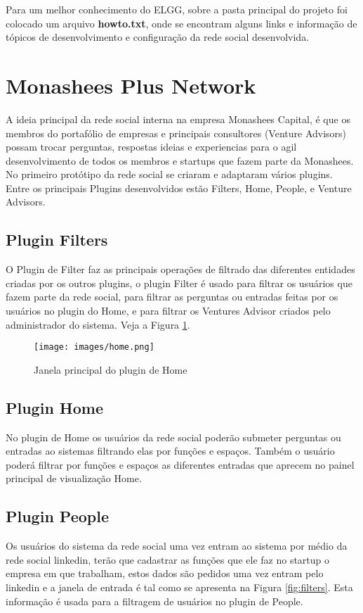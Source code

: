 \documentclass[12pt, letterpaper, onecolumn]{article}
\begin{document}
Para um melhor conhecimento do ELGG, sobre a pasta principal do projeto foi colocado um arquivo {\bf howto.txt}, onde se encontram alguns links e informação de tópicos de desenvolvimento e configuração da rede social desenvolvida.

\section{Monashees Plus Network}
A ideia principal da rede social interna na empresa Monashees Capital, é que os membros do portafólio de empresas e principais consultores (Venture Advisors) possam trocar perguntas, respostas ideias e experiencias para o agil desenvolvimento de todos os membros e startups que fazem parte da Monashees. \\

No primeiro protótipo da rede social se criaram e adaptaram vários plugins. Entre os principais Plugins desenvolvidos estão Filters, Home, People, e Venture Advisors.

\subsection{Plugin Filters}
O Plugin de Filter faz as principais operações de filtrado das diferentes entidades criadas por os outros plugins, o plugin Filter é usado para filtrar os usuários que fazem parte da rede social, para filtrar as perguntas ou entradas feitas por os usuários no plugin do Home, e para filtrar os Ventures Advisor criados pelo administrador do sistema. Veja a Figura \ref{fig:Home}.

\begin{figure}[htpb]
\centering
\texttt{[image: images/home.png]}
\caption{Janela principal do plugin de Home}
\label{fig:Home}
\end{figure}

\subsection{Plugin Home}
No plugin de Home os usuários da rede social poderão submeter perguntas ou entradas ao sistemas filtrando elas por funções e espaços. Também o usuário poderá filtrar por funções e espaços as diferentes entradas que aprecem no painel principal de visualização Home.

\subsection{Plugin People}
Os usuários do sistema da rede social uma vez entram ao sistema por médio da rede social linkedin, terão que cadastrar as funções que ele faz no startup o empresa em que trabalham, estos dados são pedidos uma vez entram pelo linkedin e a janela de entrada é tal como se apresenta na Figura  \ref{fig:filters}. Esta informação é usada para a filtragem de usuários no plugin de People. 
\end{document}
